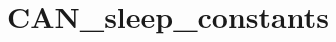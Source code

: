 \hypertarget{group___c_a_n__sleep__constants}{\section{C\-A\-N\-\_\-sleep\-\_\-constants}
\label{group___c_a_n__sleep__constants}
}
